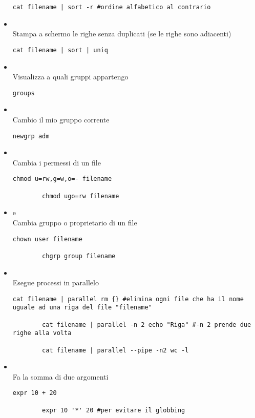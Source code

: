 \documentclass[../main.tex]{subfiles}
\begin{document}
\begin{itemize}
\begin{lstlisting}[style=bash]
        cat filename | sort -r #ordine alfabetico al contrario
    \end{lstlisting}
    \item {} \\
    Stampa a schermo le righe senza duplicati (se le righe sono adiacenti)
    \begin{lstlisting}[style=bash]
        cat filename | sort | uniq
    \end{lstlisting}
    \item {} \\
    Visualizza a quali gruppi appartengo
    \begin{lstlisting}[style=bash]
        groups
    \end{lstlisting}
    \item {} \\
    Cambio il mio gruppo corrente
    \begin{lstlisting}[style=bash]
        newgrp adm
    \end{lstlisting}
    \item {} \\
    Cambia i permessi di un file
    \begin{lstlisting}[style=bash]
        chmod u=rw,g=w,o=- filename

        chmod ugo=rw filename
    \end{lstlisting}
    \item {} e  \\
    Cambia gruppo o proprietario di un file
    \begin{lstlisting}[style=bash]
        chown user filename

        chgrp group filename
    \end{lstlisting}
    \item {} \\
    Esegue processi in parallelo
    \begin{lstlisting}[style=bash]
        cat filename | parallel rm {} #elimina ogni file che ha il nome uguale ad una riga del file "filename"

        cat filename | parallel -n 2 echo "Riga" #-n 2 prende due righe alla volta

        cat filename | parallel --pipe -n2 wc -l
    \end{lstlisting}
    \item {} \\
    Fa la somma di due argomenti
    \begin{lstlisting}[style=bash]
        expr 10 + 20

        expr 10 '*' 20 #per evitare il globbing
    \end{lstlisting}
\end{itemize}
\pagebreak
\end{document}
